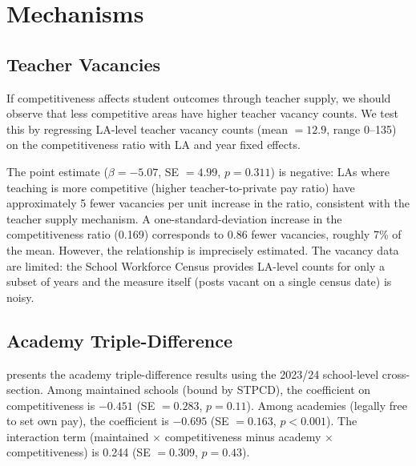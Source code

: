 \documentclass[12pt]{article}
\begin{document}
\section{Mechanisms}

\subsection{Teacher Vacancies}

If competitiveness affects student outcomes through teacher supply, we should observe that less competitive areas have higher teacher vacancy counts. We test this by regressing LA-level teacher vacancy counts (mean $= 12.9$, range 0--135) on the competitiveness ratio with LA and year fixed effects.

The point estimate ($\beta = -5.07$, SE $= 4.99$, $p = 0.311$) is negative: LAs where teaching is more competitive (higher teacher-to-private pay ratio) have approximately 5 fewer vacancies per unit increase in the ratio, consistent with the teacher supply mechanism. A one-standard-deviation increase in the competitiveness ratio (0.169) corresponds to 0.86 fewer vacancies, roughly 7\% of the mean. However, the relationship is imprecisely estimated. The vacancy data are limited: the School Workforce Census provides LA-level counts for only a subset of years and the measure itself (posts vacant on a single census date) is noisy.

\subsection{Academy Triple-Difference}

 presents the academy triple-difference results using the 2023/24 school-level cross-section. Among maintained schools (bound by STPCD), the coefficient on competitiveness is $-0.451$ (SE $= 0.283$, $p = 0.11$). Among academies (legally free to set own pay), the coefficient is $-0.695$ (SE $= 0.163$, $p < 0.001$). The interaction term (maintained $\times$ competitiveness minus academy $\times$ competitiveness) is 0.244 (SE $= 0.309$, $p = 0.43$).
\end{document}
